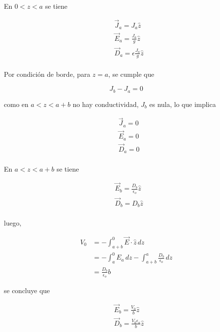 \begin{solucion}{4}
En $0<z<a$ se tiene

\begin{equation}
\begin{split}
    &\Vec{J}_a=J_a\hat{z}\\
    &\Vec{E}_a=\frac{J_a}{g}\hat{z}\\
    &\Vec{D}_a=\epsilon\frac{J_a}{g}\hat{z}\\
\end{split}
\nonumber
\end{equation}

Por condición de borde, para $z=a$, se cumple que

\[J_b-J_a=0\]

como en $a<z<a+b$ no hay conductividad, $J_b$ es nula, lo que implica

\begin{equation}
\begin{split}
    &\Vec{J}_a=0\\
    &\Vec{E}_a=0\\
    &\Vec{D}_a=0\\
\end{split}
\nonumber
\end{equation}

En $a<z<a+b$ se tiene

\begin{equation}
\begin{split}
    &\Vec{E}_b=\frac{D_b}{\epsilon_o}\hat{z}\\
    &\Vec{D}_b=D_b\hat{z}\\
\end{split}
\nonumber
\end{equation}

luego,

\begin{equation}
\begin{split}
    V_0 &= -\int^0_{a+b}\Vec{E}\cdot\hat{z}\,dz\\
    &= -\int^0_a E_a\,dz- \int^a_{a+b}\frac{D_b}{\epsilon_o}\,dz\\
    &= \frac{D_b}{\epsilon_o}b
\end{split}
\nonumber
\end{equation}

se concluye que

\begin{equation}
\begin{split}
    &\Vec{E}_b=\frac{V_0}{b}\hat{z}\\
    &\Vec{D}_b=\frac{V_0\epsilon_o}{b}\hat{z}\\
\end{split}
\nonumber
\end{equation}


\end{solucion}
